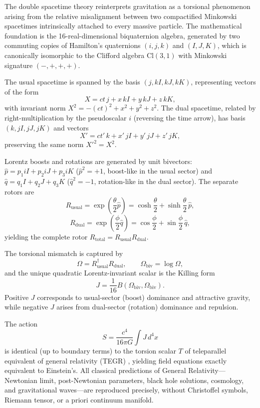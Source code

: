 \documentclass[a4paper]{article}
\begin{document}
The double spacetime theory \cite{original-dst-paper} reinterprets gravitation as a torsional phenomenon arising from the relative misalignment between two compactified Minkowski spacetimes intrinsically attached to every massive particle. The mathematical foundation is the 16-real-dimensional biquaternion algebra, generated by two commuting copies of Hamilton's quaternions $(i,j,k)$ and $(I,J,K)$, which is canonically isomorphic to the Clifford algebra $\mathrm{Cl}(3,1)$ with Minkowski signature $(-,+,+,+)$.

The usual spacetime is spanned by the basis $(j, kI, kJ, kK)$, representing vectors of the form
\[
X = ct \, j + x \, kI + y \, kJ + z \, kK,
\]
with invariant norm $X^2 = -(ct)^2 + x^2 + y^2 + z^2$. The dual spacetime, related by right-multiplication by the pseudoscalar $i$ (reversing the time arrow), has basis $(k, jI, jJ, jK)$ and vectors
\[
X' = ct' \, k + x' \, jI + y' \, jJ + z' \, jK,
\]
preserving the same norm $X'^2 = X^2$.

Lorentz boosts and rotations are generated by unit bivectors: $\hat{p} = p_1 iI + p_2 iJ + p_3 iK$ ($\hat{p}^2 = +1$, boost-like in the usual sector) and $\hat{q} = q_1 I + q_2 J + q_3 K$ ($\hat{q}^2 = -1$, rotation-like in the dual sector). The separate rotors are
\[
R_\text{usual} = \exp\!\left( \frac{\theta}{2} \hat{p} \right) = \cosh\frac{\theta}{2} + \sinh\frac{\theta}{2} \, \hat{p},
\]
\[
R_\text{dual} = \exp\!\left( \frac{\phi}{2} \hat{q} \right) = \cos\frac{\phi}{2} + \sin\frac{\phi}{2} \, \hat{q},
\]
yielding the complete rotor $R_\text{total} = R_\text{usual} R_\text{dual}$.

The torsional mismatch is captured by
\[
\Omega = R_\text{usual}^\dagger R_\text{dual}, \qquad \Omega_\text{biv} = \log \Omega,
\]
and the unique quadratic Lorentz-invariant scalar is the Killing form
\[
J = \frac{1}{16} B(\Omega_\text{biv}, \Omega_\text{biv}).
\]
Positive $J$ corresponds to usual-sector (boost) dominance and attractive gravity, while negative $J$ arises from dual-sector (rotation) dominance and repulsion.

The action
\[
S = \frac{c^4}{16\pi G} \int J \, d^4x
\]
is identical (up to boundary terms) to the torsion scalar $T$ of teleparallel equivalent of general relativity (TEGR) \cite{maluf2013}, yielding field equations exactly equivalent to Einstein's. All classical predictions of General Relativity—Newtonian limit, post-Newtonian parameters, black hole solutions, cosmology, and gravitational waves—are reproduced precisely, without Christoffel symbols, Riemann tensor, or a priori continuum manifold.
\end{document}

